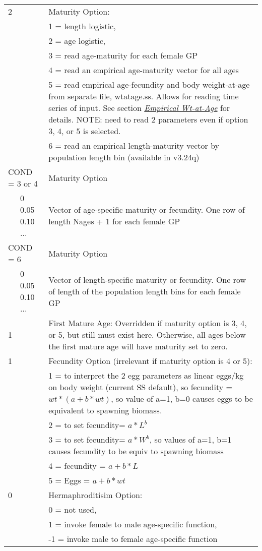 \begin{center}
\begin{longtable}{p{0.5cm} p{2cm} p{12cm}}
	   2 & & Maturity Option: \\
	     & & 1 = length logistic,\\
	     & & 2 = age logistic,\\
	     & & 3 = read age-maturity for each female GP\\
	     & & 4 = read an empirical age-maturity vector for all ages\\
	     & & 5 = read empirical age-fecundity and body weight-at-age from separate file, wtatage.ss.  Allows for reading time series of input. See section \hyperlink{WAA}{\textit{Empirical Wt-at-Age}} for details. NOTE:  need to read 2 parameters even if option 3, 4, or 5 is selected.\\
	     & & 6 = read an empirical length-maturity vector by population length bin (available in v3.24q)\\
	   \hline

	   \multicolumn{2}{l}{COND = 3 or 4} & Maturity Option\\
	   & 0 0.05 0.10 ... & Vector of age-specific maturity or fecundity.  One row of length Nages + 1 for each female GP\\
	   \multicolumn{2}{l}{COND = 6} & Maturity Option\\
	   & 0 0.05 0.10 ... & Vector of length-specific maturity or fecundity.  One row of length of the population length bins for each female GP\\
	   \hline

	   1 & & First Mature Age: Overridden if maturity option is 3, 4, or 5, but still must exist here.  Otherwise, all ages below the first mature age will have maturity set to zero.\\
	   \hline

	   1 & & Fecundity Option (irrelevant if maturity option is 4 or 5):\\
	     & & 1 = to  interpret the 2 egg parameters as linear eggs/kg on body weight (current SS default),  so fecundity = $wt * (a+b*wt)$, so value of a=1, b=0 causes eggs to be equivalent to spawning biomass.\\
	     & & 2 = to set fecundity= $a*L^ b$\\
	     & & 3 = to set fecundity= $a*W^ b$, so values of a=1, b=1 causes fecundity to be equiv to spawning biomass\\
	     & & 4 = fecundity = $a+b*L$\\
	     & & 5 = Eggs = $a+b*wt$\\
	  \hline

	  0 & & Hermaphroditisim Option:\\
	   &  & 0 = not used, \\
	   &  & 1 = invoke female to male age-specific function, \\
	   &  & -1 = invoke male to female age-specific function \\
	  \hline


\end{longtable}
\end{center}
